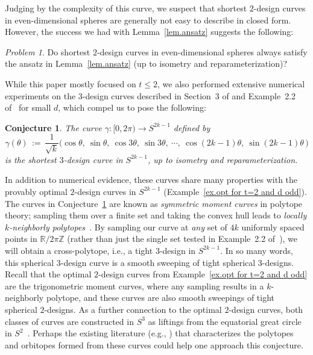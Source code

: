 \documentclass[12pt]{article}
\theoremstyle{plain}
\newtheorem{conj}[thm]{Conjecture}
\theoremstyle{definition}
\theoremstyle{remark}
\newtheorem{prob}[thm]{Problem}
\newcommand{\bR}{\mathbb{R}}
\newcommand{\bZ}{\mathbb{Z}}
\begin{document}
Judging by the complexity of this curve, we suspect that shortest $2$-design curves in even-dimensional spheres are generally not easy to describe in closed form.
However, the success we had with Lemma~\ref{lem.ansatz} suggests the following:

\begin{prob}
Do shortest $2$-design curves in even-dimensional spheres always satisfy the ansatz in Lemma~\ref{lem.ansatz} (up to isometry and reparameterization)?
\end{prob}

While this paper mostly focused on $t\leq2$, we also performed extensive numerical experiments on the $3$-design curves described in Section~3 of \cite{Lindblad:24} and Example~2.2 of~\cite{EhlerGK:25} for small $d$, which compel us to pose the following:


\begin{conj}\label{conj:3Sodd}
The curve $\gamma\colon[0,2\pi)\to S^{2k-1}$ defined by
\[
\gamma(\theta)
\,:=\,\frac{1}{\sqrt{k}}\big(
\cos\theta,
~\sin\theta,
~\cos3\theta,
~\sin3\theta,
~\cdots,
~\cos (2k-1)\theta,
~\sin(2k-1)\theta
\,\big)
\]
is the shortest $3$-design curve in $S^{2k-1}$, up to isometry and reparameterization.
\end{conj}
In addition to numerical evidence, these curves share many properties with the provably optimal $2$-design curves in $S^{2k-1}$ (Example~\ref{ex.opt for t=2 and d odd}).
The curves in Conjecture~\ref{conj:3Sodd} are known as \emph{symmetric moment curves} in polytope theory; sampling them over a finite set and taking the convex hull leads to \emph{locally $k$-neighborly polytopes}~\cite{BarvinokN:08,Novik:23,Smilansky:85,Smilansky:90}.
By sampling our curve at \textit{any} set of $4k$ uniformly spaced points in $\bR/2\pi \bZ$ (rather than just the single set tested in Example~2.2 of~\cite{EhlerGK:25}), we will obtain a cross-polytope, i.e., a tight $3$-design in $S^{2k-1}$.
In so many words, this spherical $3$-design curve is a smooth sweeping of tight spherical $3$-designs.
Recall that the optimal $2$-design curves from Example~\ref{ex.opt for t=2 and d odd} are the trigonometric moment curves, where any sampling results in a $k$-neighborly polytope, and these curves are also smooth sweepings of tight spherical $2$-designs.
As a further connection to the optimal $2$-design curves,  both classes of curves are constructed in $S^3$ as liftings from the equatorial great circle in $S^2$~\cite{Lindblad:24}.
Perhaps the existing literature (e.g., \cite{BarvinokN:08,Vinzant:11,BarvinokLN:13,AdamsBF:20,Novik:23}) that characterizes the polytopes and orbitopes formed from these curves could help one approach this conjecture.
\end{document}
